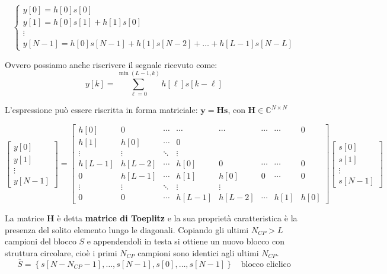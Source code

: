 \[
    \begin{cases}
        y[0] = h[0]s[0] \\
        y[1] = h[0]s[1] + h[1]s[0] \\
        \vdots \\
        y[N-1] = h[0]s[N-1] + h[1]s[N-2] + \ldots + h[L-1]s[N-L]
    \end{cases}
\]

Ovvero possiamo anche riscrivere il segnale ricevuto come:
\[
y[k] = \sum_{\ell=0}^{\min(L-1, k)} h[\ell] s[k-\ell]
\]


L'espressione può essere riscritta in forma matriciale: $\mathbf{y} = \mathbf{H} \mathbf{s}$, con $\mathbf{H} \in \mathbb{C}^{N \times N}$ 

\[ 
\begin{bmatrix} y[0] \\ y[1] \\ \vdots \\ y[N-1] \end{bmatrix} 
= 
\begin{bmatrix}
    h[0] & 0 & \cdots & \cdots & \cdots & \cdots & \cdots & 0 \\
    h[1] & h[0] & \cdots & 0 \\
    \vdots & \vdots & \ddots & \vdots \\
    h[L-1] & h[L-2] & \cdots & h[0] & 0 & \cdots & \cdots & 0 \\
    0 & h[L-1] & \cdots & h[1] & h[0] & 0 & \cdots & 0 \\
    \vdots & \vdots & \ddots & \vdots & \vdots \\
    0 & 0 & \cdots & h[L-1] & h[L-2] & \cdots & h[1] & h[0]
\end{bmatrix}   
\begin{bmatrix} s[0] \\ s[1] \\ \vdots \\ s[N-1] \end{bmatrix}
\]

La matrice $\mathbf{H}$ è detta \textbf{matrice di Toeplitz} e la sua proprietà caratteristica è la presenza del solito elemento lungo le diagonali. Copiando gli ultimi $N_{CP} > L$ campioni del blocco $S$ e appendendoli in testa si ottiene un nuovo blocco con struttura circolare, cioè i primi $N_{CP}$ campioni sono identici agli ultimi $N_{CP}$.
\[
    \overline{S} = \left\{s\left[N - N_{CP} - 1\right], \ldots, s\left[N - 1\right], s\left[0\right], \ldots, s\left[N - 1\right]\right\} \quad \text{blocco cliclico}
\]


